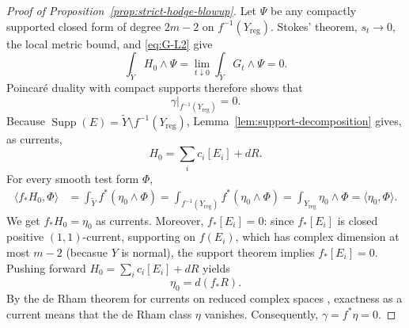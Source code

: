 \documentclass[reqno]{amsart}
\newcommand{\reg}{\mathrm{reg}}
\theoremstyle{plain}
\theoremstyle{remark}
\begin{document}
\begin{proof}[Proof of Proposition~\ref{prop:strict-hodge-blowup}]
Let $\Psi$ be any compactly supported closed form of degree $2m-2$
on $f^{-1}(Y_{\reg})$.  Stokes' theorem, $s_t\to0$, the local metric
bound, and \eqref{eq:G-L2} give
\[
 \int_{\widetilde Y}H_0\wedge\Psi
 =
 \lim_{t\downarrow0}\int_{\widetilde Y}G_t\wedge\Psi=0.
\]
Poincar\'e duality with compact supports therefore shows that
\[
 \gamma|_{f^{-1}(Y_{\reg})}=0.
\]
Because $\operatorname{Supp}(E)=\widetilde Y\setminus
f^{-1}(Y_{\reg})$, Lemma~\ref{lem:support-decomposition} gives, as
currents,
\[
 H_0=\sum_i c_i[E_i]+dR.
\]
For every smooth test form \(\Phi\),
\[
\begin{aligned}
\langle f_*H_0,\Phi\rangle
&=\int_{\widetilde Y}f^*(\eta_0\wedge\Phi)
=\int_{f^{-1}(Y_{\reg})}f^*(\eta_0\wedge\Phi)=\int_{Y_{\reg}}\eta_0\wedge\Phi
=\langle\eta_0,\Phi\rangle.
\end{aligned}
\]
We get $f_*H_0=\eta_0$ as currents. Moreover,
$f_*[E_i]=0$: since $f_*[E_i]$ is closed positive $(1,1)$-current, supporting on $f(E_i)$, which has complex dimension at most $m-2$
(becasue $Y$ is normal), the support theorem \cite[Cahter III, Corollary 2.14]{D12} implies $f_*[E_i]=0$. Pushing forward $H_0=\sum_{i}c_i[E_i]+dR$ yields
\[
 \eta_0=d(f_*R).
\]
By the de Rham theorem for currents on reduced complex spaces
\cite{BH69}, exactness as a current means that the de Rham class
$\eta$ vanishes. Consequently,
$\gamma=f^*\eta=0$.


\end{proof}
\end{document}
